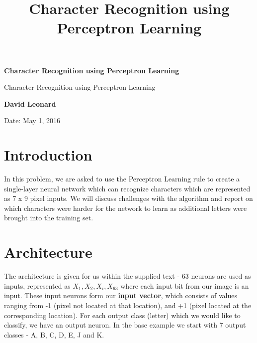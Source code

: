 \documentclass{article}
\title{Character Recognition using Perceptron Learning}
\begin{document}
\nocite{*}


\begin{titlepage}
    \begin{center}
        \vspace*{7.5cm}
        {\bf Character Recognition using Perceptron Learning}
        
        \vspace{0.5cm}
        
        Character Recognition using Perceptron Learning

        
        \vspace{7.5cm}        
        
        \textbf{David Leonard}
	
	\vspace{0.5cm} 
	Date: May 1, 2016
        
        \vspace{1in}
        \vfill
        
    \end{center}
\end{titlepage}

\tableofcontents

\newpage

\section{Introduction}

In this problem, we are asked to use the Perceptron Learning rule to create a single-layer neural network which can recognize characters which are represented as 7 x 9 pixel inputs. We will discuss challenges with the algorithm and report on which characters were harder for the network to learn as additional letters were brought into the training set.

\section{Architecture}

The architecture is given for us within the supplied text - 63 neurons are used as inputs, represented as $X_1, X_2, X_{i}, X_{63}$ where each input bit from our image is an input. These input neurons form our \textbf{input vector}, which consists of values ranging from -1 (pixel not located at that location), and +1 (pixel located at the corresponding location). For each output class (letter) which we would like to classify, we have an output neuron. In the base example we start with 7 output classes - A, B, C, D, E, J and K.
\end{document}
